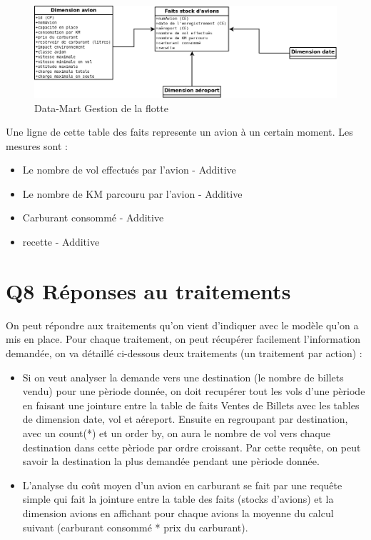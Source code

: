 \documentclass[oneside,13pt,a4paper]{article}
\begin{document}
\begin{figure}[h]
  \centering
  \includegraphics[width=1\textwidth]{img/flotteAvions.png}
  \caption{Data-Mart Gestion de la flotte}
\end{figure}

Une ligne de cette table des faits represente un avion à un certain moment. Les mesures sont :
\begin{itemize}
  \item Le nombre de vol effectués par l'avion - Additive
  \item Le nombre de KM parcouru par l'avion - Additive
  \item Carburant consommé - Additive
  \item recette - Additive
\end{itemize}

\section{Q8 Réponses au traitements}

On peut répondre aux traitements qu'on vient d'indiquer avec le modèle qu'on a mis en place. Pour chaque traitement, on peut récupérer facilement l'information demandée, on va détaillé ci-dessous deux traitements (un traitement par action) : 
\begin{itemize}
  \item Si on veut analyser la demande vers une destination (le nombre de billets vendu) pour une pèriode donnée, on doit recupérer tout les vols d'une pèriode en faisant une jointure entre la table de faits Ventes de Billets avec les tables de dimension date, vol et aéreport. Ensuite en regroupant par destination, avec un count(*) et un order by, on aura le nombre de vol vers chaque destination dans cette pèriode par ordre croissant. Par cette requête, on peut savoir la destination la plus demandée pendant une pèriode donnée.
  \item L'analyse du coût moyen d'un avion en carburant se fait par une requête simple qui fait la jointure entre la table des faits (stocks d'avions) et la dimension avions en affichant pour chaque avions la moyenne du calcul suivant (carburant consommé * prix du carburant).
\end{itemize}
\end{document}
